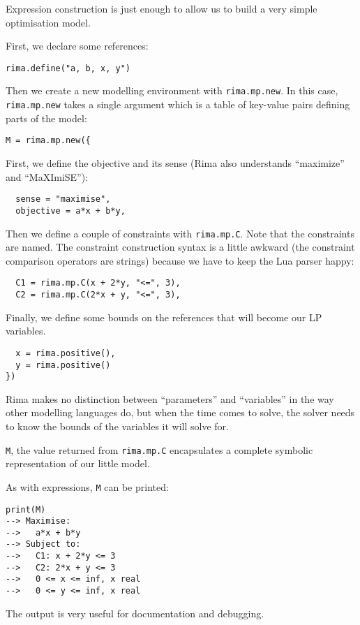 \documentclass[a4paper,12pt]{article}
\begin{document}
Expression construction is just enough to allow us to build a very simple optimisation model.

First, we declare some references:
  \begin{lstlisting}
rima.define("a, b, x, y")
  \end{lstlisting}

Then we create a new modelling environment with \lstinline!rima.mp.new!.
In this case, \lstinline!rima.mp.new! takes a single argument which is a
table of key-value pairs defining parts of the model:
  \begin{lstlisting}
M = rima.mp.new({
  \end{lstlisting}

First, we define the objective and its sense (Rima also understands ``maximize'' and ``MaXImiSE''):
  \begin{lstlisting}
  sense = "maximise",
  objective = a*x + b*y,
  \end{lstlisting}

Then we define a couple of constraints with \lstinline!rima.mp.C!.
Note that the constraints are named.
The constraint construction syntax is a little awkward (the constraint comparison operators are strings) because we have to keep the Lua parser happy:
  \begin{lstlisting}
  C1 = rima.mp.C(x + 2*y, "<=", 3),
  C2 = rima.mp.C(2*x + y, "<=", 3),
  \end{lstlisting}

Finally, we define some bounds on the references that will become our LP variables.
  \begin{lstlisting}
  x = rima.positive(),
  y = rima.positive()
})
  \end{lstlisting}
Rima makes no distinction between ``parameters'' and ``variables''
in the way other modelling languages do,
but when the time comes to solve,
the solver needs to know the bounds of the variables it will solve for.

\lstinline!M!, the value returned from \lstinline!rima.mp.C!
encapsulates a complete symbolic representation of our little model.

As with expressions, \lstinline!M! can be printed:
  \begin{lstlisting}
print(M)
--> Maximise:
-->   a*x + b*y
--> Subject to:
-->   C1: x + 2*y <= 3
-->   C2: 2*x + y <= 3
-->   0 <= x <= inf, x real
-->   0 <= y <= inf, x real
  \end{lstlisting}
The output is very useful for documentation and debugging.
\end{document}
